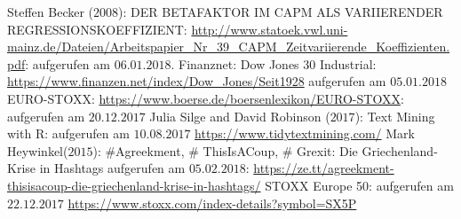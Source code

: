 
	\newpage
	\begin{thebibliography}{12345678}	
	 Steffen Becker ($2008$): DER BETAFAKTOR IM CAPM ALS VARIIERENDER REGRESSIONSKOEFFIZIENT: \url{http://www.statoek.vwl.uni-mainz.de/Dateien/Arbeitspapier_Nr_39_CAPM_Zeitvariierende_Koeffizienten.pdf}: aufgerufen am $06.01.2018$.
	 Finanznet: Dow Jones 30 Industrial: \url{https://www.finanzen.net/index/Dow_Jones/Seit1928} aufgerufen am $05.01.2018$	
	 EURO-STOXX: \url{https://www.boerse.de/boersenlexikon/EURO-STOXX}: aufgerufen am $20.12.2017$	
	Julia Silge and David Robinson ($2017$): Text Mining with R: aufgerufen am $10.08.2017$ \url{https://www.tidytextmining.com/}
	 Mark Heywinkel($2015$): \#Agreekment, \# ThisIsACoup, \# Grexit: Die Griechenland-Krise in Hashtags
	aufgerufen am $05.02.2018$:  \url{https://ze.tt/agreekment-thisisacoup-die-griechenland-krise-in-hashtags/}
	 STOXX Europe 50: aufgerufen am $22.12.2017$ \url{https://www.stoxx.com/index-details?symbol=SX5P}
\end{thebibliography}
\clearpage